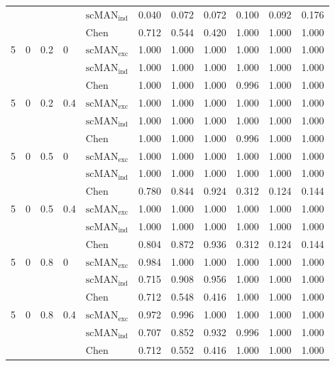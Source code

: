 \begin{table}[H]
\begin{tabular}{lllllllllll}
 &  &  &  & $\mathrm{scMAN}_{\mathrm{ind}}$ & 0.040 & 0.072 & 0.072 & 0.100 & 0.092 & 0.176 \\
 &  &  &  & Chen & 0.712 & 0.544 & 0.420 & 1.000 & 1.000 & 1.000 \\
5 & 0 & 0.2 & 0 & $\mathrm{scMAN}_{\mathrm{exc}}$ & 1.000 & 1.000 & 1.000 & 1.000 & 1.000 & 1.000 \\
 &  &  &  & $\mathrm{scMAN}_{\mathrm{ind}}$ & 1.000 & 1.000 & 1.000 & 1.000 & 1.000 & 1.000 \\
 &  &  &  & Chen & 1.000 & 1.000 & 1.000 & 0.996 & 1.000 & 1.000 \\
5 & 0 & 0.2 & 0.4 & $\mathrm{scMAN}_{\mathrm{exc}}$ & 1.000 & 1.000 & 1.000 & 1.000 & 1.000 & 1.000 \\
 &  &  &  & $\mathrm{scMAN}_{\mathrm{ind}}$ & 1.000 & 1.000 & 1.000 & 1.000 & 1.000 & 1.000 \\
 &  &  &  & Chen & 1.000 & 1.000 & 1.000 & 0.996 & 1.000 & 1.000 \\
5 & 0 & 0.5 & 0 & $\mathrm{scMAN}_{\mathrm{exc}}$ & 1.000 & 1.000 & 1.000 & 1.000 & 1.000 & 1.000 \\
 &  &  &  & $\mathrm{scMAN}_{\mathrm{ind}}$ & 1.000 & 1.000 & 1.000 & 1.000 & 1.000 & 1.000 \\
 &  &  &  & Chen & 0.780 & 0.844 & 0.924 & 0.312 & 0.124 & 0.144 \\
5 & 0 & 0.5 & 0.4 & $\mathrm{scMAN}_{\mathrm{exc}}$ & 1.000 & 1.000 & 1.000 & 1.000 & 1.000 & 1.000 \\
 &  &  &  & $\mathrm{scMAN}_{\mathrm{ind}}$ & 1.000 & 1.000 & 1.000 & 1.000 & 1.000 & 1.000 \\
 &  &  &  & Chen & 0.804 & 0.872 & 0.936 & 0.312 & 0.124 & 0.144 \\
5 & 0 & 0.8 & 0 & $\mathrm{scMAN}_{\mathrm{exc}}$ & 0.984 & 1.000 & 1.000 & 1.000 & 1.000 & 1.000 \\
 &  &  &  & $\mathrm{scMAN}_{\mathrm{ind}}$ & 0.715 & 0.908 & 0.956 & 1.000 & 1.000 & 1.000 \\
 &  &  &  & Chen & 0.712 & 0.548 & 0.416 & 1.000 & 1.000 & 1.000 \\
5 & 0 & 0.8 & 0.4 & $\mathrm{scMAN}_{\mathrm{exc}}$ & 0.972 & 0.996 & 1.000 & 1.000 & 1.000 & 1.000 \\
 &  &  &  & $\mathrm{scMAN}_{\mathrm{ind}}$ & 0.707 & 0.852 & 0.932 & 0.996 & 1.000 & 1.000 \\
 &  &  &  & Chen & 0.712 & 0.552 & 0.416 & 1.000 & 1.000 & 1.000 \\
\hline
\end{tabular}
\end{table}
